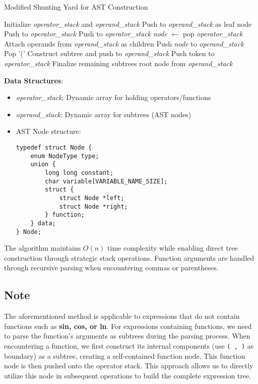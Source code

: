 \documentclass{report}
\begin{document}
\begin{algorithm}[H]
\caption{Modified Shunting Yard for AST Construction}
\begin{algorithmic}[1]
\State Initialize \textit{operator\_stack} and \textit{operand\_stack}
        \State Push to \textit{operand\_stack} as leaf node
        \State Push to \textit{operator\_stack}
        \State Push to \textit{operator\_stack}
            \State \textit{node} $\gets$ pop \textit{operator\_stack}
            \State Attach operands from \textit{operand\_stack} as children
            \State Push \textit{node} to \textit{operand\_stack}
        \EndWhile
        \State Pop '('
    \Else {}
            \State Construct subtree and push to \textit{operand\_stack}
        \EndWhile
        \State Push token to \textit{operator\_stack}
    \EndIf
\EndFor
{}
    \State Finalize remaining subtrees
\EndWhile
\State \Return root node from \textit{operand\_stack}
\end{algorithmic}
\end{algorithm}

\textbf{Data Structures}:
\begin{itemize}
    \item \textit{operator\_stack}: Dynamic array for holding operators/functions
    \item \textit{operand\_stack}: Dynamic array for subtrees (AST nodes)
    \item AST Node structure:
    \begin{verbatim}
typedef struct Node {
    enum NodeType type;
    union {
        long long constant;
        char variable[VARIABLE_NAME_SIZE];
        struct {
            struct Node *left;
            struct Node *right;
        } function;
    } data;
} Node;
    \end{verbatim}
\end{itemize}

The algorithm maintains $O(n)$ time complexity while enabling direct tree construction through strategic stack operations. Function arguments are handled through recursive parsing when encountering commas or parentheses.

\subsection*{Note}
The aforementioned method is applicable to expressions that do not contain functions such as \textbf{sin, cos, or ln}. For expressions containing functions, we need to parse the function's arguments as subtrees during the parsing process. When encountering a function, we first construct its internal components (use \texttt{( , )} as boundary) as a subtree, creating a self-contained function node. This function node is then pushed onto the operator stack. This approach allows us to directly utilize this node in subsequent operations to build the complete expression tree.
\end{document}
